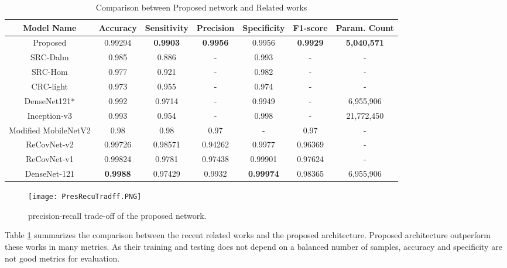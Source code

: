 \begin{table}[!p!t]
\caption{Comparison between Proposed network and Related works }
\begin{center}
\begin{tabular}{|c|c|c|c|c|c|c|}
\hline
\textbf{Model Name}& \textbf{Accuracy} & \textbf{Sensitivity} &\textbf{ Precision} & \textbf{Specificity} & \textbf{F1-score} & \textbf{Param. Count}\\
\hline
\hline
Proposed & 0.99294 & \textbf{0.9903} & \textbf{0.9956} & 0.9956 & \textbf{0.9929} & \textbf{5,040,571}\\
\hline
SRC-Dalm\cite{ar} & 0.985 & 0.886 & - & 0.993 & - & -\\
\hline 
SRC-Hom\cite{ar} & 0.977 & 0.921 & - & 0.982 & - & - \\
\hline
CRC-light\cite{ar} & 0.973 & 0.955 & - & 0.974 & - &- \\
\hline
DenseNet121*\cite{ar} & 0.992 & 0.9714 & - & 0.9949 & - & 6,955,906  \\
\hline
Inception-v3\cite{ar} & 0.993 & 0.954 & - & 0.998 & - & 21,772,450  \\
\hline
Modified MobileNetV2 \cite{akt}  & 0.98 & 0.98 & 0.97 & - & 0.97 & -\\
\hline
ReCovNet-v2\cite{dag} & 0.99726 & 0.98571 & 0.94262 & 0.9977 & 0.96369 &- \\
\hline
ReCovNet-v1\cite{dag} & 0.99824 & 0.9781 & 0.97438 & 0.99901 & 0.97624 & -\\
\hline
DenseNet-121\cite{dag}  & \textbf{0.9988} & 0.97429 & 0.9932 & \textbf{0.99974} & 0.98365 & 6,955,906 \\
\hline
\end{tabular}
\end{center}
\label{rwcom}
\end{table}


\begin{center}
\begin{figure}[htbp]
\centerline{\texttt{[image: PresRecuTradff.PNG]}}
\caption{precision-recall trade-off of the proposed network.}
\label{prt}
\end{figure}
\end{center}


Table \ref{rwcom} summarizes the comparison between the recent related works and the proposed architecture. Proposed architecture outperform these works in many metrics. As their training and testing does not depend on a balanced number of samples, accuracy and specificity are not good metrics for  evaluation. 
